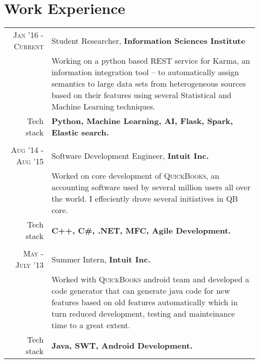 \documentclass{article} %
\begin{document}
\section{Work Experience}
\renewcommand{\arraystretch}{0.85}%
\begin{tabular}{r|p{13cm}}
\textsc{Jan '16 - Current} & Student Researcher, \textbf{Information Sciences Institute} \\
& \small{Working on a python based REST service for Karma, an information integration tool – to automatically assign semantics to large data sets from heterogeneous sources based on their features using several Statistical and Machine Learning techniques.}\\
\small{Tech stack} &\footnotesize{\textbf{Python, Machine Learning, AI, Flask, Spark, Elastic search.}} \\
\multicolumn{2}{c}{} \\


\textsc{Aug '14 - Aug '15} & Software Development Engineer, \textbf{Intuit Inc.} \\
& \small{Worked on core development of \textsc{QuickBooks}, an accounting software used by several million users all over the world. I effeciently drove several initiatives in QB core.}\\
\small{Tech stack} &\footnotesize{\textbf{C++, C\#, .NET, MFC, Agile Development.}} \\
\multicolumn{2}{c}{} \\

\textsc{May - July '13} & Summer Intern, \textbf{Intuit Inc.}\\ 
& \small{Worked with \textsc{QuickBooks} android  team and developed a code generator that can generate java code for new features based on old features automatically which in turn reduced development, testing and mainteinance time to a great extent.}\\
\small{Tech stack} &\footnotesize{\textbf{Java, SWT, Android Development.}}\\




\end{tabular}
\end{document}
